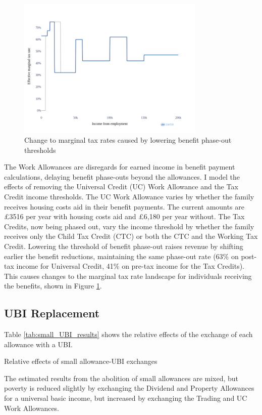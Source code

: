 \documentclass{article}
\begin{document}
    \begin{figure}
        \centering
        \includegraphics[width=0.8\textwidth]{images/fig_11.png}
        \caption{Change to marginal tax rates caused by lowering benefit phase-out thresholds}
        \label{fig:benefit_mtr_changes}
    \end{figure}

    The Work Allowances are disregards for earned income in benefit payment calculations, delaying benefit phase-outs beyond the allowances. I model the effects of removing the Universal Credit (UC) Work Allowance and the Tax Credit income thresholds. The UC Work Allowance varies by whether the family receives housing costs aid in their benefit payments. The current amounts are £3516 per year with housing costs aid and £6,180 per year without. The Tax Credits, now being phased out, vary the income threshold by whether the family receives only the Child Tax Credit (CTC) or both the CTC and the Working Tax Credit. Lowering the threshold of benefit phase-out raises revenue by shifting earlier the benefit reductions, maintaining the same phase-out rate (63\% on post-tax income for Universal Credit, 41\% on pre-tax income for the Tax Credits). This causes changes to the marginal tax rate landscape for individuals receiving the benefits, shown in Figure \ref{fig:benefit_mtr_changes}. 
    
    \subsection{UBI Replacement}

    Table \ref{tab:small_UBI_results} shows the relative effects of the exchange of each allowance with a UBI.

    \begin{table}[h]
        \centering
        
        \caption{Relative effects of small allowance-UBI exchanges}
        \label{tab:small_UBI_results}
    \end{table}
    The estimated results from the abolition of small allowances are mixed, but poverty is reduced slightly by exchanging the Dividend and Property Allowances for a universal basic income, but increased by exchanging the Trading and UC Work Allowances.
\end{document}
